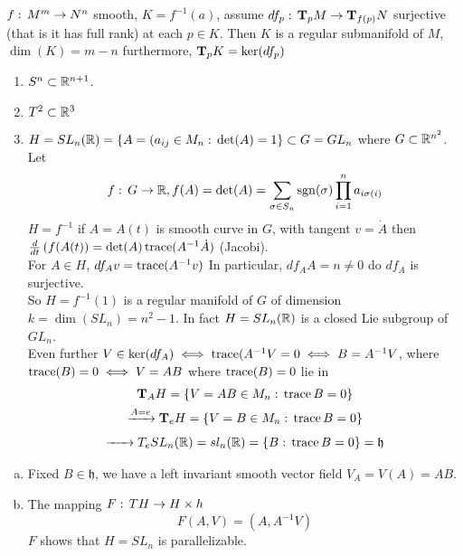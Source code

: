 \begin{teorema}
$f:\, M^m \to N^n$ smooth, $K=f^{-1}(a)$, assume $df_p:\, \text{\textbf{T}}_pM \to \text{\textbf{T}}_{f(p)}N$ surjective (that is it has full rank) at each $p\in K$. Then $K$ is a regular submanifold of $M$, $\dim(K)=m-n$ furthermore, $\text{\textbf{T}}_pK= \ker(df_p)$
\begin{enumerate}[1.]
\item $S^n \subset \mathbb{R}^{n+1}$.
\item $T^2 \subset \mathbb{R}^3$
\item $H=SL_n(\mathbb{R}) = \{A=(a_{ij} \in M_n :\, \det(A)=1 \}\subset G = GL_n$ where $G\subset \mathbb{R}^{n^2}$. Let 
$$f:\, G\to \mathbb{R}, f(A) = \det(A) = \sum_{\sigma\in S_n} \operatorname{sgn}(\sigma) \prod_{i=1}^n a_{i\sigma(i)}$$
$H=f^{-1}$ if $A=A(t)$ is smooth curve in $G$, with tangent $v=\dot A$ then $\frac{d}{dt}\left(f(A(t)\right)=\det(A)\operatorname{trace}(A^{-1}\dot A)$ (Jacobi).\\
For $A\in H$, $df_Av=\operatorname{trace}(A^{-1}v)$ In particular, $df_AA=n\neq 0$ do $df_A$ is surjective.\\
So $H=f^{-1}(1)$ is a regular manifold of $G$ of dimension $k=\dim(SL_n) = n^2-1$. In fact $H=SL_n(\mathbb{R})$ is a closed Lie subgroup of $GL_n$.\\
Even further $V\in \ker(df_A) \iff \operatorname{trace}(A^{-1} V=0 \iff B=A^{-1} V$, where $\operatorname{trace}(B)=0 \iff V=AB$ where $\operatorname{trace}(B)=0$ lie in 
\begin{gather*}
\text{\textbf{T}}_AH = \{V=AB\in M_n:\, \operatorname{trace} B =0 \} \\
\xrightarrow{A=e} \text{\textbf{T}}_eH = \{V=B\in M_n:\, \operatorname{trace} B =0 \} \\
\xrightarrow{\phantom{A=e}} T_eSL_n(\mathbb{R}) = sl_n(\mathbb{R}) = \{B:\, \operatorname{trace} B =0 \} = \mathfrak{h}
\end{gather*}
\end{enumerate}
\end{teorema}

\begin{remarks}
\begin{enumerate}[a)]
\item Fixed $B\in \mathfrak{h}$, we have a left invariant smooth vector field $V_A = V(A)=AB$.
\item The mapping  $F:\, TH \to H\times h$
$$F(A,V) = (A,A^{-1}V)$$
$F$ shows that $H=SL_n$ is parallelizable.
\end{enumerate}
\end{remarks}

